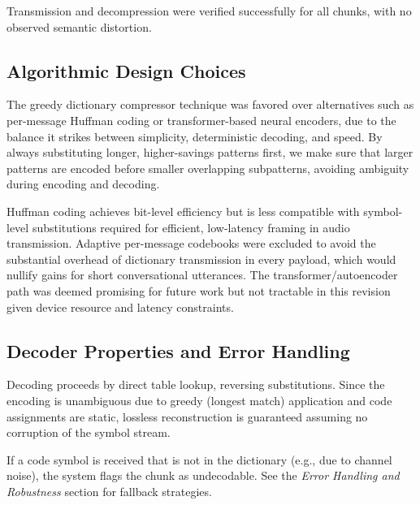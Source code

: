 \documentclass[12pt,openany]{article}
\theoremstyle{definition}
\theoremstyle{definition}
\theoremstyle{definition}
\begin{document}
\noindent
Transmission and decompression were verified successfully for all chunks, with no observed semantic distortion.



\subsection*{Algorithmic Design Choices}
The greedy dictionary compressor technique was favored over alternatives such as per-message Huffman coding or transformer-based neural encoders, due to the balance it strikes between simplicity, deterministic decoding, and speed. By  always substituting longer, higher-savings patterns first, we make sure that larger patterns are encoded before smaller overlapping subpatterns, avoiding ambiguity during encoding and decoding.

Huffman coding achieves bit-level efficiency but is less compatible with symbol-level substitutions required for efficient, low-latency framing in audio transmission. Adaptive per-message codebooks were excluded to avoid the substantial overhead of dictionary transmission in every payload, which would nullify gains for short conversational utterances. The transformer/autoencoder path was deemed promising for future work but not tractable in this revision given device resource and latency constraints.

\subsection*{Decoder Properties and Error Handling}
Decoding proceeds by direct table lookup, reversing substitutions. Since the encoding is unambiguous due to greedy (longest match) application and code assignments are static, lossless reconstruction is guaranteed assuming no corruption of the symbol stream.

If a code symbol is received that is not in the dictionary (e.g., due to channel noise), the system flags the chunk as undecodable. See the \textit{Error Handling and Robustness} section for fallback strategies.
\end{document}
